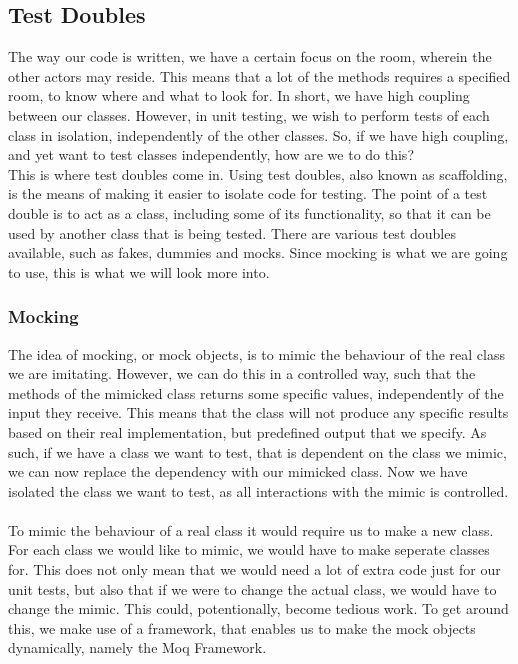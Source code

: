 \subsection{Test Doubles}
The way our code is written, we have a certain focus on the room, wherein the other actors may reside. This means that a lot of the methods requires a specified room, to know where and what to look for. In short, we have high coupling between our classes. However, in unit testing, we wish to perform tests of each class in isolation, independently of the other classes. So, if we have high coupling, and yet want to test classes independently, how are we to do this? \\ This is where test doubles come in. Using test doubles, also known as scaffolding, is the means of making it easier to isolate code for testing. The point of a test double is to act as a class, including some of its functionality, so that it can be used by another class that is being tested\cite{TestingCodeComplete}. There are various test doubles available, such as fakes, dummies and mocks. Since mocking is what we are going to use, this is what we will look more into.

\subsubsection{Mocking} \label{MockingSection}
The idea of mocking, or mock objects, is to mimic the behaviour of the real class we are imitating. However, we can do this in a controlled way, such that the methods of the mimicked class returns some specific values, independently of the input they receive. This means that the class will not produce any specific results based on their real implementation, but predefined output that we specify\cite{TestingAdaptiveCode}. As such, if we have a class we want to test, that is dependent on the class we mimic, we can now replace the dependency with our mimicked class. Now we have isolated the class we want to test, as all interactions with the mimic is controlled. \\
\\
To mimic the behaviour of a real class it would require us to make a new class. For each class we would like to mimic, we would have to make seperate classes for. This does not only mean that we would need a lot of extra code just for our unit tests, but also that if we were to change the actual class, we would have to change the mimic. This could, potentionally, become tedious work. To get around this, we make use of a framework, that enables us to make the mock objects dynamically, namely the Moq Framework.

